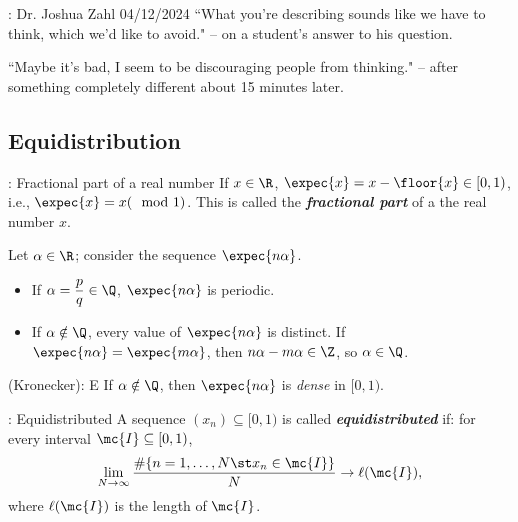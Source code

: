 \begin{nquote}{: Dr. Joshua Zahl 04/12/2024}
    ``What you're describing sounds like we have to think, which we'd like to avoid." -- on a student's answer to his question.

    \medskip

    ``Maybe it's bad, I seem to be discouraging people from thinking." -- after something completely different about 15 minutes later.
\end{nquote}

\subsection{Equidistribution}

\begin{ndef}{: Fractional part of a real number}
    If \(x\in\R\), \(\expec{x}=x-\floor{x}\in[0,1)\), i.e., \(\expec{x}=x(\mod 1)\). This is called the \emph{\textbf{fractional part}} of a the real number \(x\).
\end{ndef}

Let \(\alpha\in\R\); consider the sequence \(\expec{n\alpha}\).
\begin{itemize}
    \item If \(\alpha=\displaystyle\frac{p}{q}\in\Q\), \(\expec{n\alpha}\) is periodic.
    
    \item If \(\alpha\notin\Q\), every value of \(\expec{n\alpha}\) is distinct. If \(\expec{n\alpha}=\expec{m\alpha}\), then \(n\alpha-m\alpha\in\Z\), so \(\alpha\in\Q\).
\end{itemize}

\begin{ntheorem}{ (Kronecker): E}
    If \(\alpha\notin\Q\), then \(\expec{n\alpha}\) is \emph{dense} in \([0,1)\).
\end{ntheorem}

\begin{ndef}{: Equidistributed}
    A sequence \((x_n)\subseteq [0,1)\) is called \emph{\textbf{equidistributed}} if: for every interval \(\mc{I}\subseteq[0,1)\), 
    \begin{equation*} 
        \lim_{N\to\infty}\frac{\#\{n=1,\dots, N\st x_n\in\mc{I}\}}{N}\to\ell(\mc{I}),
    \end{equation*}
    where \(\ell(\mc{I})\) is the length of \(\mc{I}\).
\end{ndef}

